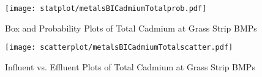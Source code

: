         \begin{figure}[hb]   %
            \centering
            \texttt{[image: statplot/metalsBICadmiumTotalprob.pdf]}
            \caption{Box and Probability Plots of Total Cadmium at Grass Strip BMPs}
        \end{figure}         %
        
        
        \begin{figure}[hb]   %
            \centering
            \texttt{[image: scatterplot/metalsBICadmiumTotalscatter.pdf]}
            \caption{Influent vs. Effluent Plots of Total Cadmium at Grass Strip BMPs}
        \end{figure}         %
        \clearpage
        